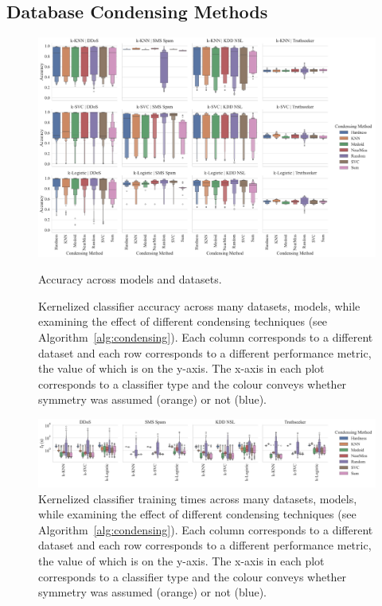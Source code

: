 \documentclass[conference]{IEEEtran}
\begin{document}
\subsection{Database Condensing Methods}

\begin{figure}[t]
    \centering
    \includegraphics[width=\textwidth]{figs/combined/condensing_methods_vs_accuracy.pdf}
    \caption{Accuracy across models and datasets.}
    \label{fig:cond_acc}
    \caption{Kernelized classifier accuracy across many datasets, models, while examining the effect of different condensing techniques (see Algorithm~\ref{alg:condensing}). Each column corresponds to a different dataset and each row corresponds to a different performance metric, the value of which is on the y-axis. The x-axis in each plot corresponds to a classifier type and the colour conveys whether symmetry was assumed (orange) or not (blue).}
    \label{fig:condensing_summary}
\end{figure}

\begin{figure}
    \centering
    \includegraphics[width=\textwidth]{figs/combined/condensing_methods_vs_train_time.pdf}
    \caption{Kernelized classifier training times across many datasets, models, while examining the effect of different condensing techniques (see Algorithm~\ref{alg:condensing}). Each column corresponds to a different dataset and each row corresponds to a different performance metric, the value of which is on the y-axis. The x-axis in each plot corresponds to a classifier type and the colour conveys whether symmetry was assumed (orange) or not (blue).}
    \label{fig:cond_train_time}
\end{figure}
\end{document}

